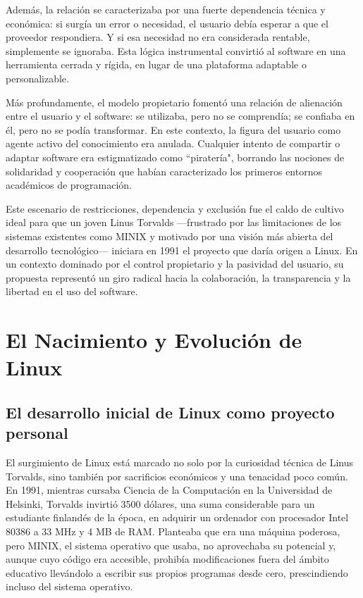 \documentclass[a4paper,12pt]{article}
\begin{document}
Además, la relación se caracterizaba por una fuerte dependencia técnica y
económica: si surgía un error o necesidad, el usuario debía esperar a que el
proveedor respondiera. Y si esa necesidad no era considerada rentable,
simplemente se ignoraba. Esta lógica instrumental convirtió al software en una
herramienta cerrada y rígida, en lugar de una plataforma adaptable o
personalizable.

Más profundamente, el modelo propietario fomentó una relación de alienación
entre el usuario y el software: se utilizaba, pero no se comprendía; se confiaba
en él, pero no se podía transformar. En este contexto, la figura del usuario
como agente activo del conocimiento era anulada. Cualquier intento de compartir
o adaptar software era estigmatizado como ``piratería", borrando las nociones de
solidaridad y cooperación que habían caracterizado los primeros entornos
académicos de programación.

Este escenario de restricciones, dependencia y exclusión fue el caldo de cultivo
ideal para que un joven Linus Torvalds —frustrado por las limitaciones de los
sistemas existentes como MINIX y motivado por una visión más abierta del
desarrollo tecnológico— iniciara en 1991 el proyecto que daría origen a Linux.
En un contexto dominado por el control propietario y la pasividad del usuario,
su propuesta representó un giro radical hacia la colaboración, la transparencia
y la libertad en el uso del software.

\newpage
\section{El Nacimiento y Evolución de Linux} 

\subsection{El desarrollo inicial de Linux como proyecto personal}

El surgimiento de Linux está marcado no solo por la curiosidad técnica de Linus
Torvalds, sino también por sacrificios económicos y una tenacidad poco común. En
1991, mientras cursaba Ciencia de la Computación en la Universidad de Helsinki,
Torvalds invirtió 3500 dólares, una suma considerable para un estudiante
finlandés de la época, en adquirir un ordenador con procesador Intel 80386 a 33
MHz y 4 MB de RAM. Planteaba que era una máquina poderosa, pero MINIX, el
sistema operativo que usaba, no aprovechaba su potencial y, aunque cuyo código
era accesible, prohibía modificaciones fuera del ámbito educativo llevándolo a
escribir sus propios programas desde cero, prescindiendo incluso del sistema
operativo.
\end{document}
